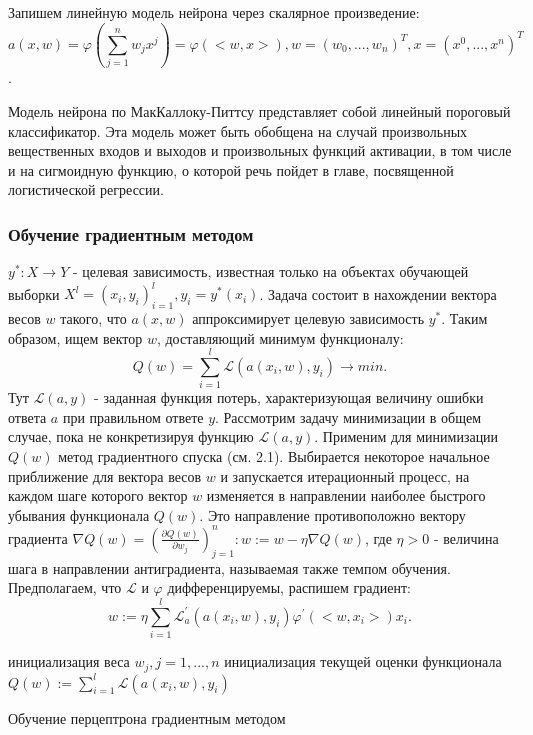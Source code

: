 \documentclass[../body.tex]{subfiles}
\begin{document}
Запишем линейную модель нейрона через скалярное произведение:
$$a(x, w) = \varphi(\sum_{j=1}^{n} w_j x^j) = \varphi(<w, x>), w = (w_0, ..., w_n)^T, x = (x^0, ..., x^n)^T$$.

Модель нейрона по МакКаллоку-Питтсу представляет собой линейный пороговый классификатор. Эта модель может быть обобщена на случай произвольных вещественных входов и выходов и произвольных функций активации, в том числе и на сигмоидную функцию, о которой речь пойдет в главе, посвященной логистической регрессии.

\subsubsection{Обучение градиентным методом}

$y^*: X\rightarrow Y$ - целевая зависимость, известная только на объектах обучающей выборки $X^l = (x_i, y_i)_{i=1}^{l}, y_i = y^*(x_i)$.
Задача состоит в нахождении вектора весов $w$ такого, что $a(x, w)$ аппроксимирует целевую зависимость $y^{*}$. Таким образом, ищем вектор $w$, доставляющий минимум функционалу:
$$Q(w) = \sum_{i=1}^{l}\mathcal{L}(a(x_i, w), y_i)\rightarrow min.$$ Тут $\mathcal{L}(a, y)$ - заданная функция потерь, характеризующая величину ошибки ответа $a$ при правильном ответе $y$. Рассмотрим задачу минимизации в общем случае, пока не конкретизируя функцию $\mathcal{L}(a, y)$.
Применим для минимизации $Q(w)$ метод градиентного спуска (см. 2.1). Выбирается некоторое начальное приближение для вектора весов $w$ и запускается итерационный процесс, на каждом шаге которого вектор $w$ изменяется в направлении наиболее быстрого убывания функционала $Q(w)$. Это направление противоположно вектору градиента $\nabla Q(w) = (\frac{\partial Q(w)}{\partial w_j})_{j=1}^n: w := w - \eta\nabla Q(w)$, где $\eta > 0$ - величина шага в направлении антиградиента, называемая также темпом обучения.
Предполагаем, что $\mathcal{L}$ и $\varphi$ дифференцируемы, распишем градиент:
$$w := \eta\sum_{i=1}^{l}\mathcal{L}_a^{'}(a(x_i, w), y_i)\varphi^{'}(<w, x_i>)x_i.$$

\begin{algorithm}[H]
	инициализация веса $w_j, j = 1, ..., n$\;
	инициализация текущей оценки функционала $Q(w) := \sum_{i=1}^l\mathcal{L}(a(x_i, w), y_i)$\;
	\caption{Обучение перцептрона градиентным методом}
\end{algorithm}
\end{document}
